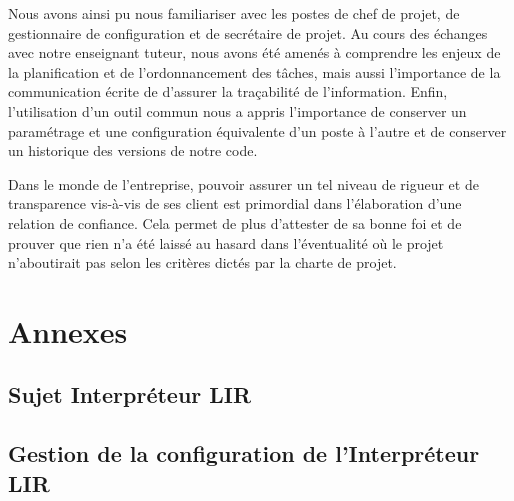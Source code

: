 \documentclass[12pt,a4paper,titlepage,openany, oneside]{report}
\begin{document}
        Nous avons ainsi pu nous familiariser avec les postes de chef de projet, de
        gestionnaire de configuration et de secrétaire de projet. Au cours des échanges
        avec notre enseignant tuteur, nous avons été amenés à comprendre les enjeux
        de la planification et de l'ordonnancement des tâches, mais aussi l'importance de
        la communication écrite de d'assurer la traçabilité de l'information. Enfin,
        l'utilisation d'un outil commun nous a appris l'importance de conserver un
        paramétrage et une configuration équivalente d'un poste à l'autre et de conserver
        un historique des versions de notre code.

        Dans le monde de l'entreprise, pouvoir assurer un tel niveau de rigueur et de
        transparence vis-à-vis de ses client est primordial dans l'élaboration d'une
        relation de confiance. Cela permet de plus d'attester de sa bonne foi et de
        prouver que rien n'a été laissé au hasard dans l'éventualité où le projet
        n'aboutirait pas selon les critères dictés par la charte de projet.

        \normalsize
    \part{Annexes}

    \appendix
    \chapter{Sujet Interpréteur LIR}
    

    \chapter{Gestion de la configuration de l'Interpréteur LIR}
    
\end{document}
